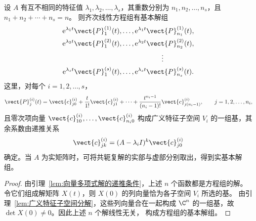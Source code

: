 \begin{theorem}\label{thm:重特征值常系数方程组的基本解组}
	设 $A$ 有互不相同的特征值
	$\lambda_1,\lambda_2,\ldots,\lambda_s$，其重数分别为
	$n_1,n_2,\ldots,n_s$，且 $n_1+n_2+\cdots+n_s=n$。
	则齐次线性方程组有基本解组
	\[
		\begin{gathered}
		\mathrm{e}^{\lambda_1t}\vect{P}^{(1)}_1(t),
		\ldots,
		\mathrm{e}^{\lambda_1t}\vect{P}^{(1)}_{n_1}(t),\\
		\mathrm{e}^{\lambda_2t}\vect{P}^{(2)}_1(t),
		\ldots,
		\mathrm{e}^{\lambda_2t}\vect{P}^{(2)}_{n_2}(t),\\
		\hspace{3.5cm}\vdots\\
		\mathrm{e}^{\lambda_st}\vect{P}^{(s)}_1(t),
		\ldots,
		\mathrm{e}^{\lambda_st}\vect{P}^{(s)}_{n_s}(t).
		\end{gathered}
	\]
	这里，对每个 $i=1,2,\ldots,s$，
	\[
		\vect{P}^{(i)}_j(t)
		=\vect{c}^{(i)}_{j0}
		+\dfrac{t}{1!}\vect{c}^{(i)}_{j1}
		+\cdots
		+\dfrac{t^{n_i-1}}{(n_i-1)!}
		\vect{c}^{(i)}_{j(n_i-1)},
		\qquad j=1,2,\ldots,n_i,
	\]
	且零次项向量
	$\vect{c}^{(i)}_{10},\ldots,\vect{c}^{(i)}_{n_i0}$
	构成广义特征子空间 $V_i$ 的一组基，其余系数由递推关系
	\[
		\vect{c}^{(i)}_{jk}
		=(A-\lambda_iI)^k\vect{c}^{(i)}_{j0}
	\]
	确定。当 $A$ 为实矩阵时，可将共轭复解的实部与虚部分别取出，得到实基本解组。
\end{theorem}

\begin{proof}
	由引理~\ref{lem:向量多项式解的递推条件}，上述 $n$ 个函数都是方程组的解。
	令它们组成解矩阵 $X(t)$，则 $X(0)$ 的列向量恰为各子空间 $V_i$ 所选的基。
	由引理~\ref{lem:广义特征子空间分解}，这些列向量合在一起构成
	$\C^n$ 的一组基，故 $\det X(0)\neq0$。因此上述 $n$ 个解线性无关，
	构成方程组的基本解组。
\end{proof}
